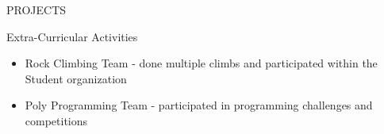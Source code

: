 \documentclass{resume} %
\begin{document}
\begin{rSection}{PROJECTS}




\end{rSection} 

\begin{rSection}{Extra-Curricular Activities} 
\begin{itemize} %
    \item   Rock Climbing Team - done multiple climbs and participated within the Student organization
    \item 	Poly Programming Team - participated in programming challenges and competitions

\end{itemize}


\end{rSection}
\end{document}
